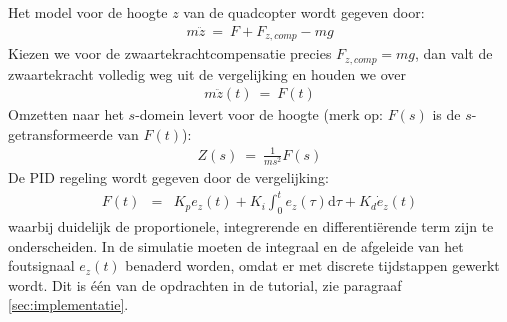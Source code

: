 \documentclass[a4paper,11pt]{article}
\begin{document}
Het model voor de hoogte $z$ van de quadcopter wordt gegeven door:
\begin{eqnarray*}
m\ddot{z} ~ = ~ F + F_{z,comp} -mg 
\end{eqnarray*}
Kiezen we voor de zwaartekrachtcompensatie precies $F_{z,comp}=mg$, dan valt de zwaartekracht volledig weg uit de vergelijking en houden we over
\begin{eqnarray}
m\ddot{z}(t) ~ = ~ F(t)
\end{eqnarray}
Omzetten naar het $s$-domein levert voor de hoogte (merk op: $F(s)$ is de $s$-getransformeerde van $F(t)$):
\begin{eqnarray}
  \label{eq:sys}
Z(s) ~ = ~ \frac{1}{ms^2} F(s)
\end{eqnarray}
De PID regeling wordt gegeven door de vergelijking:
\begin{eqnarray}
  F(t) & = & K_p e_z(t) + K_i \int_0^t e_z(\tau)\mbox{d}\tau + K_d
  \dot{e}_z(t)
\end{eqnarray}
waarbij duidelijk de proportionele, integrerende en differenti\"erende term
zijn te onderscheiden. In de simulatie moeten de integraal en de afgeleide van
het foutsignaal $e_z(t)$ benaderd worden, omdat er met discrete tijdstappen
gewerkt wordt. Dit is \'e\'en van de opdrachten in de tutorial, zie paragraaf \ref{sec:implementatie}.
\end{document}
